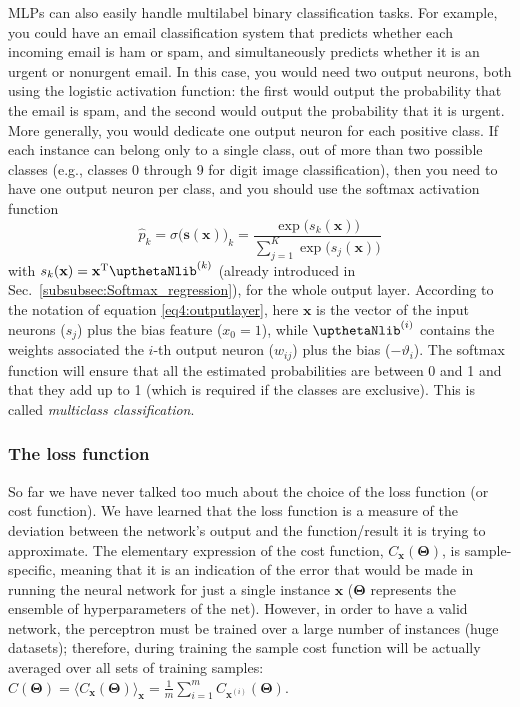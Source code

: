 MLPs can also easily handle multilabel binary classification tasks. For example, you could have an email classification system that predicts whether each incoming email is ham or spam, and simultaneously predicts whether it is an urgent or nonurgent email. In this case, you would need two output neurons, both using the logistic activation function: the first would output the probability that the email is spam, and the second would output the probability that it is urgent. More generally, you would dedicate one output neuron for each positive class.
If each instance can belong only to a single class, out of more than two possible classes (e.g., classes 0 through 9 for digit image classification), then you need to have one output neuron per class, and you should use the softmax activation function
\begin{equation}
\widehat{p}_k={\sigma\bigl(\mathbf{s}(\mathbf{x})\bigr)}_k=\frac{\exp{\bigl(s_k(\mathbf{x})\bigr)}}{\sum_{j=1}^K\exp{\bigl(s_j(\mathbf{x})\bigr)}}
\end{equation}
with $s_k(\mathbf{x})=\mathbf{x}^{\mathrm{T}}\boldtheta^{(k)}$ (already introduced in Sec.~\ref{subsubsec:Softmax_regression}), for the whole output layer. According to the notation of equation \eqref{eq4:outputlayer}, here $\mathbf{x}$ is the vector of the input neurons ($s_j$) plus the bias feature ($x_0=1$), while $\boldtheta^{(i)}$ contains the weights associated the $i$-th output neuron ($w_{ij}$) plus the bias ($-\vartheta_i$). The softmax function will ensure that all the estimated probabilities are between 0 and 1 and that they add up to 1 (which is required if the classes are exclusive). This is called \emph{multiclass classification}.
\subsubsection*{The loss function}
So far we have never talked too much about the choice of the loss function (or cost function). We have learned that the loss function is a measure of the deviation between the network's output and the function/result it is trying to approximate. The elementary expression of the cost function, $C_{\mathbf{x}}(\boldsymbol{\Theta})$, is sample-specific, meaning that it is an indication of the error that would be made in running the neural network for just a single instance $\mathbf{x}$ ($\boldsymbol{\Theta}$ represents the ensemble of hyperparameters of the net). However, in order to have a valid network, the perceptron must be trained over a large number of instances (huge datasets); therefore, during training the sample cost function will be actually averaged over all sets of training samples: $C(\boldsymbol{\Theta})={\bigl\langle C_{\mathbf{x}}(\boldsymbol{\Theta})\bigr\rangle}_{\mathbf{x}}=\frac{1}{m}\sum_{i=1}^mC_{\mathbf{x}^{(i)}}(\boldsymbol{\Theta})$.

